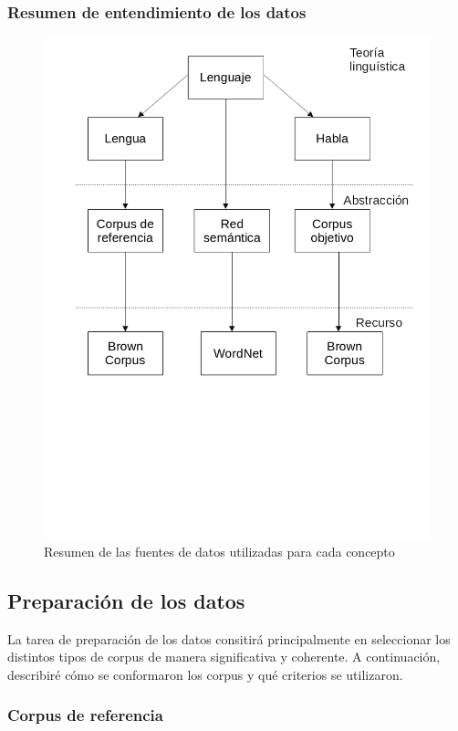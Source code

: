\documentclass[12pt,letterpaper,twoside]{article}
\begin{document}
\subsubsection{Resumen de entendimiento de los datos}
\label{sec:orgf8c370c}
\begin{figure}[htbp]
\centering
\includegraphics[width=.9\linewidth]{./assets/entendimiento_de_los_datos.png}
\caption{Resumen de las fuentes de datos utilizadas para cada concepto}
\end{figure}


\subsection{Preparación de los datos}
\label{sec:orgd0a0902}
\label{sec:preparacion_datos}
La tarea de preparación de los datos consitirá principalmente en
seleccionar los distintos tipos de corpus de manera significativa
y coherente.  A continuación, describiré cómo se conformaron los
corpus y qué criterios se utilizaron.

\subsubsection{Corpus de referencia}
\label{sec:org20f85e6}
\end{document}
